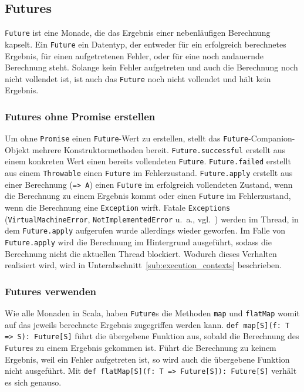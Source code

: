 \subsection{Futures} %
\label{sub:futures}

\lstinline|Future| ist eine Monade, die das Ergebnis einer nebenläufigen Berechnung kapselt.
Ein \lstinline|Future| ein Datentyp, der entweder für ein erfolgreich berechnetes Ergebnis, für einen aufgetretenen Fehler, oder für eine noch andauernde Berechnung steht.
Solange kein Fehler aufgetreten und auch die Berechnung noch nicht vollendet ist, ist auch das \lstinline|Future| noch nicht vollendet und hält kein Ergebnis.

\subsubsection{Futures ohne Promise erstellen} %
\label{ssub:futures_erstellen}

Um ohne \lstinline|Promise| einen \lstinline|Future|-Wert zu erstellen, stellt das \lstinline|Future|-Companion-Objekt mehrere Konstruktormethoden bereit.
\lstinline|Future.successful| erstellt aus einem konkreten Wert einen bereits vollendeten \lstinline|Future|.
\lstinline|Future.failed| erstellt aus einem \lstinline|Throwable| einen \lstinline|Future| im Fehlerzustand.
\lstinline|Future.apply| erstellt aus einer Berechnung (\lstinline|=> A|) einen \lstinline|Future| im erfolgreich vollendeten Zustand, wenn die Berechnung zu einem Ergebnis kommt oder einen \lstinline|Future| im Fehlerzustand, wenn die Berechnung eine \lstinline|Exception| wirft.
Fatale \lstinline|Exceptions| (\lstinline|VirtualMachineError|, \lstinline|NotImplementedError| u.~a., vgl.~\citealt{nonfatal_exceptions}) werden im Thread, in dem \lstinline|Future.apply| aufgerufen wurde allerdings wieder geworfen.
Im Falle von \lstinline|Future.apply| wird die Berechnung im Hintergrund ausgeführt, sodass die Berechnung nicht die aktuellen Thread blockiert.
Wodurch dieses Verhalten realisiert wird, wird in Unterabschnitt~\ref{sub:execution_contexts} beschrieben.


\subsubsection{Futures verwenden} %
\label{ssub:futures_verwenden}

Wie alle Monaden in Scala, haben \lstinline|Future|s die Methoden \lstinline|map| und \lstinline|flatMap| womit auf das jeweils berechnete Ergebnis zugegriffen werden kann.
\lstinline|def map[S](f: T => S): Future[S]| führt die übergebene Funktion aus, sobald die Berechnung des \lstinline|Future|s zu einem Ergebnis gekommen ist.
Führt die Berechnung zu keinem Ergebnis, weil ein Fehler aufgetreten ist, so wird auch die übergebene Funktion nicht ausgeführt.
Mit \lstinline|def flatMap[S](f: T => Future[S]): Future[S]| verhält es sich genauso.

